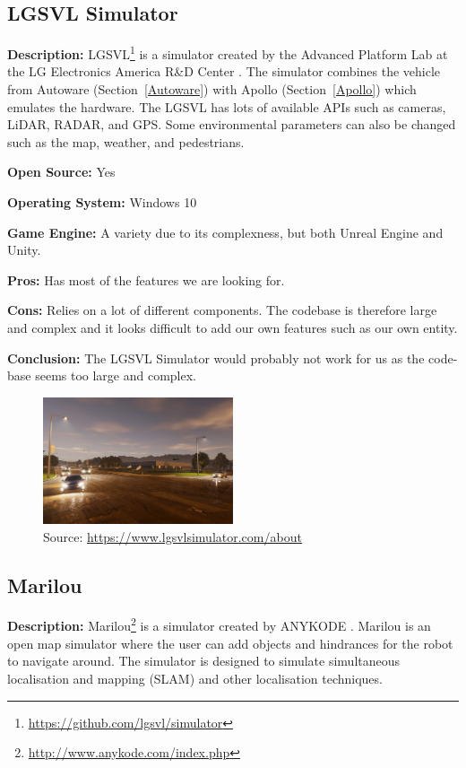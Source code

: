 \subsection{LGSVL Simulator} \label{LGSVL_Simulator}
\textbf{Description:} LGSVL\footnote{\url{https://github.com/lgsvl/simulator}} is a simulator created by the Advanced Platform Lab at the LG Electronics America R\&D Center \cite{LGSVL_Web}. The simulator combines the vehicle from Autoware (Section~\ref{Autoware}) with Apollo (Section~\ref{Apollo}) which emulates the hardware. The LGSVL has lots of available APIs such as cameras, LiDAR, RADAR, and GPS. Some environmental parameters can also be changed such as the map, weather, and pedestrians.

\textbf{Open Source:} Yes

\textbf{Operating System:} Windows 10

\textbf{Game Engine:} A variety due to its complexness, but both Unreal Engine and Unity.

\textbf{Pros:} Has most of the features we are looking for.

\textbf{Cons:} Relies on a lot of different components. The codebase is therefore large and complex and it looks difficult to add our own features such as our own entity.

\textbf{Conclusion:} The LGSVL Simulator would probably not work for us as the code-base seems too large and complex.

\begin{figure}[H]
    \centering
    \includegraphics[width=0.5\textwidth]{Simulators/LGSVL.jpg}
    \caption{Source: \url{https://www.lgsvlsimulator.com/about}}
\end{figure}

\subsection{Marilou}
\textbf{Description:} Marilou\footnote{\url{http://www.anykode.com/index.php}} is a simulator created by ANYKODE \cite{Marilou_Web}. Marilou is an open map simulator where the user can add objects and hindrances for the robot to navigate around. The simulator is designed to simulate simultaneous localisation and mapping (SLAM) and other localisation techniques. 

